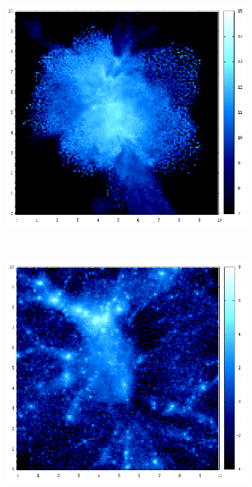 \documentclass[journal]{IEEEtran}
\begin{document}
\begin{figure}[htb]
\begin{subfigure}[t]{0.25\textwidth}
	\end{subfigure}
	\quad
	\begin{subfigure}[t]{0.25\textwidth}
		\centering
		\includegraphics[width=\linewidth]{TEMP05-06.png}
	\end{subfigure}
	\\
	\begin{subfigure}[t]{0.25\textwidth}
		\centering
		\includegraphics[width=\linewidth]{DM06-07.png}

\end{subfigure}
\end{figure}
\end{document}
